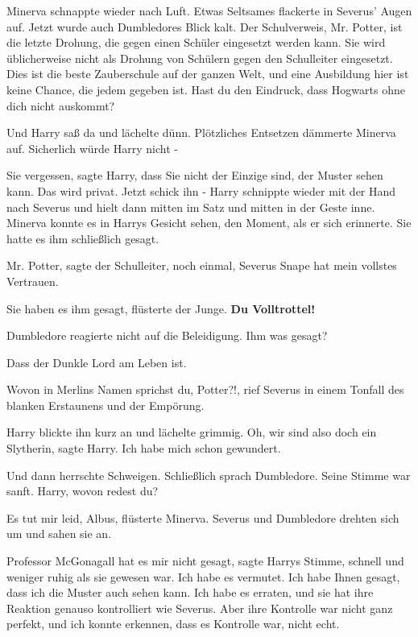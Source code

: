 Minerva schnappte wieder nach Luft. Etwas Seltsames flackerte in Severus' Augen
auf. Jetzt wurde auch Dumbledores Blick kalt. \glqq Der Schulverweis, Mr.
Potter, ist die letzte Drohung, die gegen einen Schüler eingesetzt werden kann.
Sie wird üblicherweise nicht als Drohung von Schülern gegen den Schulleiter
eingesetzt. Dies ist die beste Zauberschule auf der ganzen Welt, und eine
Ausbildung hier ist keine Chance, die jedem gegeben ist. Hast du den Eindruck,
dass Hogwarts ohne dich nicht auskommt?\grqq{}

Und Harry saß da und lächelte dünn. Plötzliches Entsetzen dämmerte Minerva auf.
Sicherlich würde Harry nicht -

\glqq Sie vergessen\grqq{}, sagte Harry, \glqq dass Sie nicht der Einzige sind,
der Muster sehen kann. Das wird privat. Jetzt schick ihn -\grqq{} Harry
schnippte wieder mit der Hand nach Severus und hielt dann mitten im Satz und
mitten in der Geste inne. Minerva konnte es in Harrys Gesicht sehen, den Moment,
als er sich erinnerte. Sie hatte es ihm schließlich gesagt.

\glqq Mr. Potter\grqq{}, sagte der Schulleiter, \glqq noch einmal, Severus Snape
hat mein vollstes Vertrauen.\grqq{}

\glqq Sie haben es ihm gesagt\grqq{}, flüsterte der Junge. \glqq \textbf{Du
Volltrottel!}\grqq{}

Dumbledore reagierte nicht auf die Beleidigung. \glqq Ihm was gesagt?\grqq{}

\glqq Dass der Dunkle Lord am Leben ist.\grqq{}

\glqq Wovon in Merlins Namen sprichst du, Potter?!\grqq{}, rief Severus in einem
Tonfall des blanken Erstaunens und der Empörung.

Harry blickte ihn kurz an und lächelte grimmig. \glqq Oh, wir sind also doch ein
Slytherin\grqq{}, sagte Harry. \glqq Ich habe mich schon gewundert.\grqq{}

Und dann herrschte Schweigen. Schließlich sprach Dumbledore. Seine Stimme war
sanft. \glqq Harry, wovon redest du?\grqq{}

\glqq Es tut mir leid, Albus\grqq{}, flüsterte Minerva. Severus und Dumbledore
drehten sich um und sahen sie an.

\glqq Professor McGonagall hat es mir nicht gesagt\grqq{}, sagte Harrys Stimme,
schnell und weniger ruhig als sie gewesen war. \glqq Ich habe es vermutet. Ich
habe Ihnen gesagt, dass ich die Muster auch sehen kann. Ich habe es erraten, und
sie hat ihre Reaktion genauso kontrolliert wie Severus. Aber ihre Kontrolle war
nicht ganz perfekt, und ich konnte erkennen, dass es Kontrolle war, nicht
echt.\grqq{}

